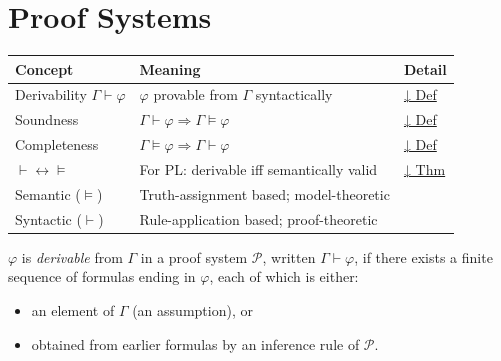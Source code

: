 
\section{Proof Systems}

\begin{tcolorbox}[colback=gray!6, colframe=gray!40, arc=2pt,
  left=6pt, right=6pt, top=4pt, bottom=4pt,
  title={\small\textbf{Proof Systems — Quick Reference}},
  fonttitle=\small\bfseries]
\small
\begin{tabular}{l l l}
\toprule
\textbf{Concept} & \textbf{Meaning} & \textbf{Detail} \\
\midrule
Derivability $\Gamma\vdash\varphi$ & $\varphi$ provable from $\Gamma$ syntactically & \hyperref[def:derivability]{↓ Def} \\
Soundness    & $\Gamma\vdash\varphi \Rightarrow \Gamma\models\varphi$ & \hyperref[def:soundness]{↓ Def} \\
Completeness & $\Gamma\models\varphi \Rightarrow \Gamma\vdash\varphi$ & \hyperref[def:completeness]{↓ Def} \\
$\vdash\leftrightarrow\models$ & For PL: derivable iff semantically valid & \hyperref[thm:sound-complete]{↓ Thm} \\
\midrule
Semantic ($\models$) & Truth-assignment based; model-theoretic & \\
Syntactic ($\vdash$) & Rule-application based; proof-theoretic & \\
\bottomrule
\end{tabular}
\end{tcolorbox}

\vspace{1em}

\begin{tcolorbox}[colback=propbox, colframe=propborder, arc=2pt,
  left=6pt, right=6pt, top=4pt, bottom=4pt,
  title={\small\textbf{Definition (Derivability)}},
  fonttitle=\small\bfseries]
\label{def:derivability}
$\varphi$ is \emph{derivable} from $\Gamma$ in a proof system $\mathcal{P}$,
written $\Gamma \vdash \varphi$, if there exists a finite sequence of formulas
ending in $\varphi$, each of which is either:
\begin{itemize}
  \item an element of $\Gamma$ (an assumption), or
  \item obtained from earlier formulas by an inference rule of $\mathcal{P}$.
\end{itemize}
\end{tcolorbox}

